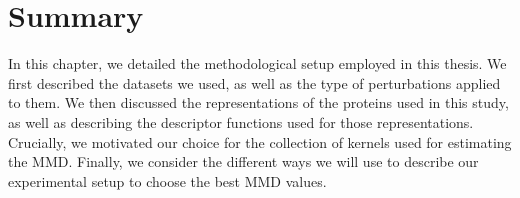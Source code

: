 
\section{Summary}

In this chapter, we detailed the methodological setup employed in this thesis.
We first described the datasets we used, as well as the type of perturbations
applied to them. We then discussed the representations of the proteins used in
this study, as well as describing the descriptor functions used for those
representations. Crucially, we motivated our choice for the collection of
kernels used for estimating the MMD. Finally, we consider the different ways we
will use to describe our experimental setup to choose the best MMD values.

